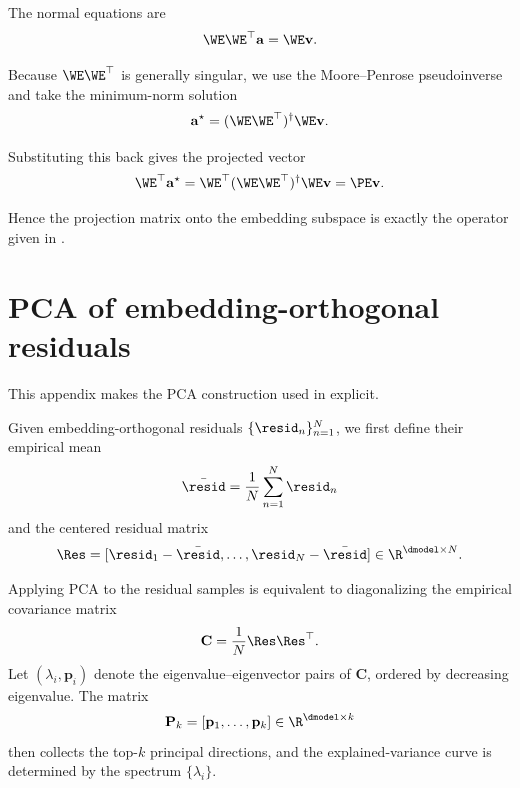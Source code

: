 \documentclass{article}
\begin{document}
The normal equations are
\begin{equation}
    \WE \WE^\top \mathbf{a} = \WE \mathbf{v} .
\end{equation}

Because $\WE \WE^\top$ is generally singular, we use the Moore--Penrose pseudoinverse and take the minimum-norm solution
\begin{equation}
    \mathbf{a}^{\star} = (\WE \WE^\top)^{\dagger} \WE \mathbf{v} .
\end{equation}

Substituting this back gives the projected vector
\begin{equation}
    \WE^\top \mathbf{a}^{\star} = \WE^\top (\WE \WE^\top)^{\dagger} \WE \mathbf{v} = \PE \mathbf{v} .
\end{equation}

Hence the projection matrix onto the embedding subspace is exactly the operator given in .

\section{PCA of embedding-orthogonal residuals} \label{apd:pca-residual-subspace}

This appendix makes the PCA construction used in  explicit.

Given embedding-orthogonal residuals $\{\resid_n\}_{n=1}^{N}$, we first define their empirical mean
\begin{equation}
  \bar{\resid} = \frac{1}{N} \sum_{n=1}^{N} \resid_n
\end{equation}
and the centered residual matrix
\begin{equation}
  \Res = [\resid_1 - \bar{\resid}, \dots, \resid_N - \bar{\resid}] \in \R^{\dmodel \times N} .
\end{equation}

Applying PCA to the residual samples is equivalent to diagonalizing the empirical covariance matrix
\begin{equation}
  \mathbf{C} = \frac{1}{N} \Res \Res^\top .
\end{equation}
Let $(\lambda_i, \mathbf{p}_i)$ denote the eigenvalue--eigenvector pairs of $\mathbf{C}$, ordered by decreasing eigenvalue. The matrix
\begin{equation}
  \mathbf{P}_k = [\mathbf{p}_1, \dots, \mathbf{p}_k] \in \R^{\dmodel \times k}
\end{equation}
then collects the top-$k$ principal directions, and the explained-variance curve is determined by the spectrum $\{\lambda_i\}$.
\end{document}
